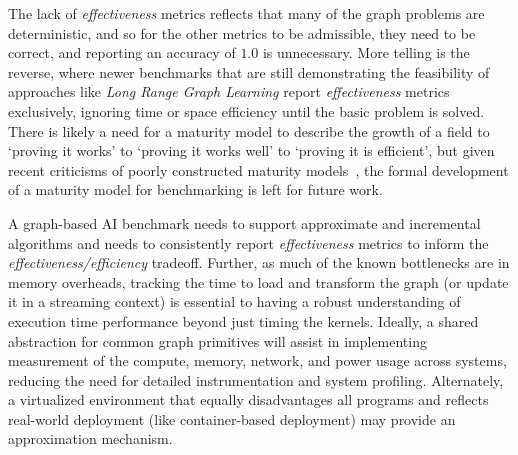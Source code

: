 The lack of \textit{effectiveness} metrics reflects that many of the graph problems are deterministic, and so for the other metrics to be admissible,  they need to be correct, and reporting an accuracy of $1.0$ is unnecessary. 
More telling is the reverse, where newer benchmarks that are still demonstrating the feasibility of approaches like \textit{Long Range Graph Learning} report \textit{effectiveness} metrics exclusively, ignoring time or space efficiency until the basic problem is solved. 
There is likely a need for a maturity model to describe the growth of a field  to `proving it works' to `proving it works well' to `proving it is efficient', but given recent criticisms of poorly constructed maturity models~\cite{Lahrmann2011, Sadiq2021}, the formal development of a maturity model for benchmarking is left for future work. 

A graph-based AI benchmark needs to support approximate and incremental algorithms and needs to consistently report \textit{effectiveness} metrics to inform the \textit{effectiveness/efficiency} tradeoff.
Further, as much of the known bottlenecks are in memory overheads,  tracking the time to load and transform the graph (or update it in a streaming context) is essential to having a robust understanding of execution time performance beyond just timing the kernels. 
Ideally, a shared abstraction for common graph primitives will assist in implementing measurement of the compute, memory, network, and power usage across systems, reducing the need for detailed instrumentation and system profiling. 
Alternately, a virtualized environment that equally disadvantages all programs and reflects real-world deployment (like container-based deployment) may provide an approximation mechanism. 

